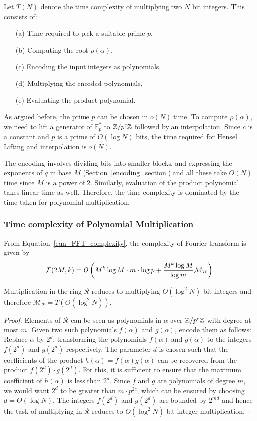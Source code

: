 \documentclass[11pt]{article}
\renewcommand{\R}{\mathcal{R}} %
\renewcommand{\F}{\mathcal{F}} %
\newcommand{\mr}{\mathcal{M}_\mathcal{R}} %
\begin{document}
Let $T(N)$ denote the time complexity of multiplying two $N$ bit
integers. This consists of:

\begin{enumerate}
\item[(a)] Time required to pick a suitable prime $p$,
\item[(b)] Computing the root $\rho(\alpha)$,
\item[(c)] Encoding the input integers as polynomials,
\item[(d)] Multiplying the encoded polynomials,
\item[(e)] Evaluating the product polynomial.
\end{enumerate}

As argued before, the prime $p$ can be chosen in $o(N)$ time. To
compute $\rho(\alpha)$, we need to lift a generator of
$\mathbb{F}_p^*$ to $\mathbb{Z}/p^c\mathbb{Z}$ followed by an interpolation. Since $c$
is a constant and $p$ is a prime of $O(\log N)$ bits, the time
required for Hensel Lifting and interpolation is $o(N)$.

The encoding involves dividing bits into smaller blocks, and
expressing the exponents of $q$ in base $M$
(Section~\ref{encoding_section}) and all these take $O(N)$ time since
$M$ is a power of $2$. Similarly, evaluation of the product polynomial
takes linear time as well. Therefore, the time complexity is dominated
by the time taken for polynomial multiplication.

\subsubsection*{Time complexity of Polynomial Multiplication}

{}{}From Equation~\ref{eqn_FFT_complexity}, the complexity of Fourier
transform is given by
\[
\F(2M,k) = O\inparen{M^k\log M\cdot m\cdot \log p + \frac{M^k\log
    M}{\log m}\mr}
\]

\begin{proposition}\cite{scho_complex}
Multiplication in the ring $\R$ reduces to multiplying $O(\log^2{N})$
bit integers and therefore $\mr = T\left(O(\log^2{N})\right)$.
\end{proposition}
\begin{proof}
  Elements of $\R$ can be seen as polynomials in $\alpha$ over
  $\mathbb{Z}/p^c\mathbb{Z}$ with degree at most $m$. Given two such polynomials
  $f(\alpha)$ and $g(\alpha)$, encode them as follows: Replace $\alpha$
  by $2^d$, transforming the polynomials $f(\alpha)$ and $g(\alpha)$
  to the integers $f(2^d)$ and $g(2^d)$ respectively.  The parameter
  $d$ is chosen such that the coefficients of the product $h(\alpha) =
  f(\alpha) g(\alpha)$ can be recovered {}from the product $f(2^d)\cdot
  g(2^d)$. For this, it is sufficient to ensure that the maximum
  coefficient of $h(\alpha)$ is less than $2^d$.  Since $f$ and $g$
  are polynomials of degree $m$, we would want $2^d$ to be greater
  than $m\cdot p^{2c}$, which can be ensured by choosing $d =
  \Theta\left(\log{N}\right)$. The integers $f(2^d)$ and $g(2^d)$ are
  bounded by $2^{md}$ and hence the task of multiplying in $\R$
  reduces to $O(\log^2{N})$ bit integer multiplication.
\end{proof}
\end{document}
